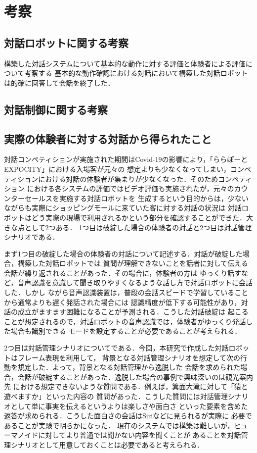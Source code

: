\section{考察}
\label{考察}
\subsection{対話ロボットに関する考察}
構築した対話システムについて基本的な動作に対する評価と体験者による評価について考察する
基本的な動作確認における対話において構築した対話ロボットは的確に回答して会話を終了した．


\subsection{対話制御に関する考察}

\subsection{実際の体験者に対する対話から得られたこと}
対話コンペティションが実施された期間はCovid-19の影響により，「ららぽーとEXPOCITY」における入場客が元々の
想定よりも少なくなってしまい，コンペティションにおける対話の体験者が集まりが少なくなった．そのためコンペティション
における各システムの評価ではビデオ評価も実施されたが，元々のカウンターセールスを実施する対話ロボットを
生成するという目的からは，少ないながらも実際にショッピングモールに来ていた客に対する対話の状況は
対話ロボットはどう実際の現場で利用されるかという部分を確認することができた．大きな点として2つある．
1つ目は破綻した場合の体験者の対話と2つ目は対話管理シナリオである．

まず1つ目の破綻した場合の体験者の対話について記述する．対話が破綻した場合，構築した対話ロボットでは
質問が理解できないことを話者に対して伝える会話が繰り返されることがあった．その場合に，体験者の方は
ゆっくり話すなど，音声認識を意識して聞き取りやすくなるような話し方で対話ロボットに会話した．しかし
ながら音声認識装置は，普段の会話スピードで学習していることから通常よりも遅く発話された場合には
認識精度が低下する可能性があり，対話の成立がますます困難になることが予測される．こうした対話破綻は
起こることが想定されるので，対話ロボットの音声認識では，体験者がゆっくり発話した場合も識別できる
モードを設定することが必要であることが考えられる．

2つ目は対話管理シナリオについてである．今回，本研究で作成した対話ロボットはフレーム表現を利用して，
背景となる対話管理シナリオを想定して次の行動を規定した．よって，背景となる対話管理から逸脱した
会話を求められた場合，会話が破綻することがあった．逸脱した場合の事例で興味深いのは観光案内先
における想定できないような質問である．例えば，箕面大滝に対して「猿と遊べますか」といった内容の
質問があった．こうした質問には対話管理シナリオとして単に事実を伝えるというよりは楽しさや面白さ
といった要素を含めた返答が求められる．こうした面白さの会話はSiriなどに見られるが実際に
必要であることが実験で明らかになった．
現在のシステムでは構築は難しいが，ヒューマノイドに対してより普通では聞かない内容を聞くことが
あることを対話管理シナリオとして用意しておくことは必要であると考えられる．



